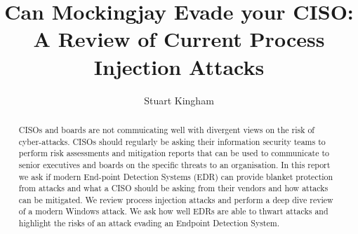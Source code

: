 \documentclass{article}
\title{Can Mockingjay Evade your CISO: A Review of Current Process Injection Attacks}
\author{Stuart Kingham}
\begin{document}
\maketitle

\begin{abstract}
  CISOs and boards are not commuicating well with divergent views on the risk of cyber-attacks.
  CISOs should regularly be asking their information security teams to perform risk assessments and mitigation reports that can be used to
  communicate to senior executives and boards on the specific threats to an organisation. 
  In this report we ask if modern End-point Detection Systems (EDR) can provide blanket protection from attacks and what a CISO should be asking from
  their vendors and how attacks can be mitigated.  We review process injection attacks and perform a deep dive review of a modern Windows attack.  We
  ask how well EDRs are able to thwart attacks and highlight the risks of an attack evading an Endpoint Detection System.
\end{abstract}

\tableofcontents





\pagebreak





\pagebreak

\printbibliography

\pagebreak

\appendix


\end{document}
